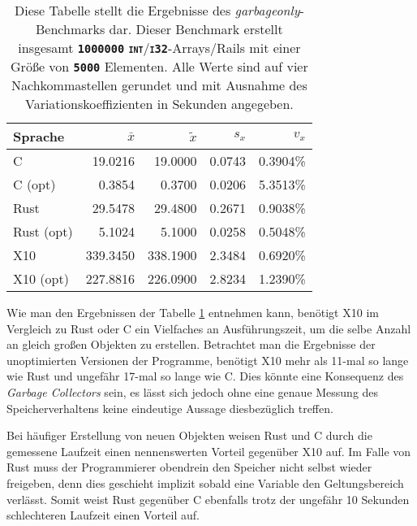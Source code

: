 \begin{table}[hb]
	\begin{center}
		\begin{tabular}{lrrrr}
			\toprule
			Sprache    & $\bar{x}$ & $\tilde{x}$ & $s_x$ & $v_x$ \\
			\midrule
			C          &  19.0216 &  19.0000 & 0.0743 & 0.3904\%  \\
			C (opt)    &   0.3854 &   0.3700 & 0.0206 & 5.3513\%  \\
			Rust       &  29.5478 &  29.4800 & 0.2671 & 0.9038\%  \\
			Rust (opt) &   5.1024 &   5.1000 & 0.0258 & 0.5048\%  \\
			X10        & 339.3450 & 338.1900 & 2.3484 & 0.6920\%  \\
			X10 (opt)  & 227.8816 & 226.0900 & 2.8234 & 1.2390\%  \\
			\bottomrule
		\end{tabular}
	\end{center}
	\caption{
		Diese Tabelle stellt die Ergebnisse des \textit{garbageonly}-Benchmarks dar. Dieser Benchmark erstellt insgesamt
		\texttt{\textsc{\textbf{1000000}}} \texttt{\textsc{\textbf{int}}}/\texttt{\textsc{\textbf{i32}}}-Arrays/Rails
		mit einer Größe von \texttt{\textsc{\textbf{5000}}} Elementen.
		Alle Werte sind auf vier Nachkommastellen gerundet und mit Ausnahme des Variationskoeffizienten
		in Sekunden angegeben.
	}
	\label{fig:garbageonly_table}
\end{table}

Wie man den Ergebnissen der Tabelle \ref{fig:garbageonly_table} entnehmen kann,
benötigt X10 im Vergleich zu Rust oder C ein Vielfaches an Ausführungszeit, um die selbe Anzahl an gleich großen
Objekten zu erstellen. Betrachtet man die Ergebnisse der unoptimierten Versionen der Programme, benötigt X10
mehr als 11-mal so lange wie Rust und ungefähr 17-mal so lange wie C.
Dies könnte eine Konsequenz des \textit{Garbage Collectors} sein, es lässt sich jedoch ohne eine genaue Messung des
Speicherverhaltens keine eindeutige Aussage diesbezüglich treffen.

Bei häufiger Erstellung von neuen Objekten weisen Rust und C durch die gemessene Laufzeit
einen nennenswerten Vorteil gegenüber X10 auf. Im Falle von Rust muss der Programmierer obendrein
den Speicher nicht selbst wieder freigeben, denn dies geschieht implizit sobald eine Variable
den Geltungsbereich verlässt. Somit weist Rust gegenüber C ebenfalls trotz der ungefähr 10 Sekunden schlechteren Laufzeit
einen Vorteil auf.

